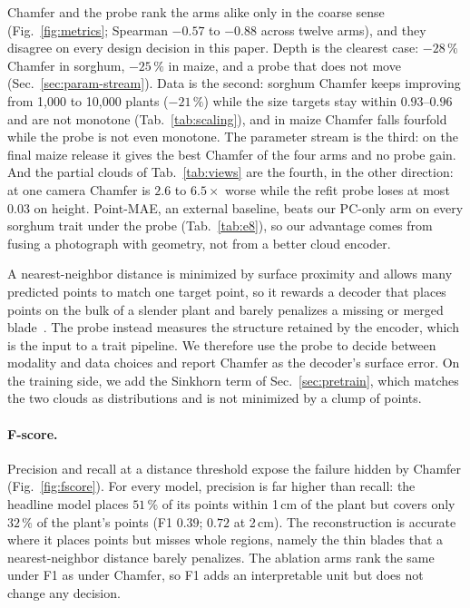 Chamfer and the probe rank the arms alike only in the coarse sense
(Fig.~\ref{fig:metrics}; Spearman $-0.57$ to $-0.88$ across twelve arms), and
they disagree on every design decision in this paper.
Depth is the clearest case: $-28\,\%$ Chamfer in sorghum, $-25\,\%$ in maize,
and a probe that does not move (Sec.~\ref{sec:param-stream}). Data is the
second: sorghum Chamfer keeps improving from 1{,}000 to 10{,}000 plants
($-21\,\%$) while the size targets stay within $0.93$--$0.96$ and are not
monotone (Tab.~\ref{tab:scaling}), and in maize Chamfer falls fourfold while the
probe is not even monotone. The parameter stream is the third: on the final
maize release it gives the best Chamfer of the four arms and no probe gain. And
the partial clouds of Tab.~\ref{tab:views} are the fourth, in the other
direction: at one camera Chamfer is $2.6$ to $6.5\times$ worse while the refit probe
loses at most $0.03$ on height. Point-MAE, an external baseline, beats our PC-only arm on every sorghum trait
under the probe (Tab.~\ref{tab:e8}), so our advantage comes from fusing a
photograph with geometry, not from a better cloud encoder.

A nearest-neighbor distance is minimized by surface proximity and allows many
predicted points to match one target point, so it rewards a decoder that places
points on the bulk of a slender plant and barely penalizes a missing or merged
blade~\cite{wu2021dcd,song2026chamfer}. The probe instead measures the
structure retained by the encoder, which is the input to a trait pipeline. We
therefore use the probe to decide between modality and data choices and report
Chamfer as the decoder's surface error. On the training side, we add the
Sinkhorn term of Sec.~\ref{sec:pretrain}, which matches the two clouds as
distributions and is not minimized by a clump of points. 

\paragraph{F-score.}
Precision and recall at a distance threshold expose the failure hidden by
Chamfer (Fig.~\ref{fig:fscore}). For every model, precision is far higher than
recall: the headline model places $51\,\%$ of its points within 1\,cm of the
plant but covers only $32\,\%$ of the plant's points (F1 $0.39$; $0.72$ at
2\,cm). The reconstruction is accurate where it places points but misses whole
regions, namely the thin blades that a nearest-neighbor distance barely
penalizes. The ablation arms rank the same under F1 as under Chamfer, so F1 adds
an interpretable unit but does not change any decision.

